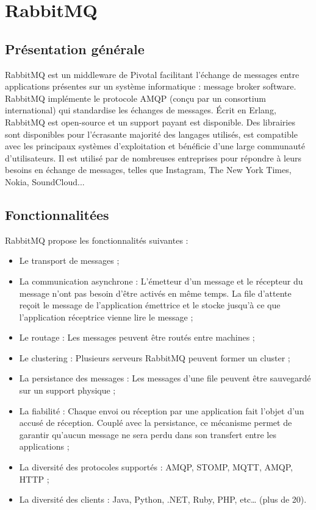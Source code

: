 \section{RabbitMQ}

\subsection{Présentation générale}

RabbitMQ est un middleware de Pivotal facilitant l’échange de messages entre applications présentes sur un système informatique :  message broker software. RabbitMQ implémente le protocole AMQP (conçu par un consortium international) qui standardise les échanges de messages. Écrit en Erlang, RabbitMQ est open-source et un support payant est disponible. Des librairies sont disponibles pour l’écrasante majorité des langages utilisés, est compatible avec les principaux systèmes d’exploitation et bénéficie d’une large communauté d’utilisateurs. Il est utilisé par de nombreuses entreprises pour répondre à leurs besoins en échange de messages, telles que Instagram, The New York Times, Nokia, SoundCloud...

\subsection{Fonctionnalitées}

RabbitMQ propose les fonctionnalités suivantes :

\begin{itemize}
  \item Le transport de messages ;
  \item La communication asynchrone : L’émetteur d'un message et le récepteur du message n'ont pas besoin d'être activés en même temps. La file d’attente reçoit le message de l'application émettrice et le stocke jusqu'à ce que l'application réceptrice vienne lire le message ;
  \item Le routage : Les messages peuvent être routés entre machines ;
  \item Le clustering : Plusieurs serveurs RabbitMQ peuvent former un cluster ;
  \item La persistance des messages : Les messages d’une file peuvent être sauvegardé sur un support physique ;
  \item La fiabilité : Chaque envoi ou réception par une application fait l'objet d'un accusé de réception. Couplé avec la persistance, ce mécanisme permet de garantir qu'aucun message ne sera perdu dans son transfert entre les applications ;
  \item La diversité des protocoles supportés : AMQP, STOMP, MQTT, AMQP, HTTP ;
  \item La diversité des clients : Java, Python, .NET, Ruby, PHP, etc… (plus de 20).
\end{itemize}

